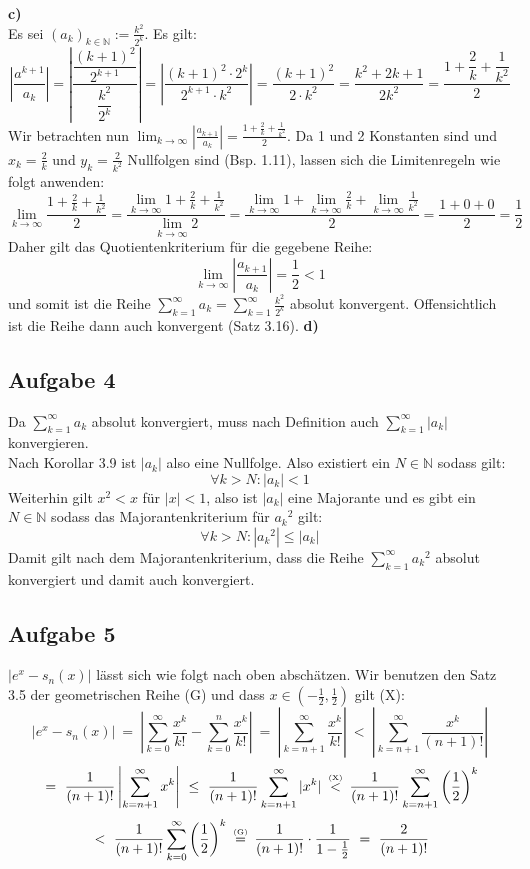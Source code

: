 \documentclass[a4paper,graphics,11pt]{article}
\newcommand{\aufgabe}[1]{\subsection*{Aufgabe #1}}
\newcommand{\up}[2]{\mathrel{\overset{\makebox[0pt]{\mbox{\normalfont\tiny #2}}}{#1}}}
\begin{document}
\textbf{c)}\\[5pt]
Es sei $\displaystyle(a_k)_{k \in \mathbb{N}} := \frac{k^2}{2^k}$. Es gilt:
$$
    \left|\frac{a^{k+1}}{a_k}\right|
    = \left|\frac{\dfrac{(k+1)^2}{2^{k+1}}}{{\dfrac{k^2}{2^k}}}\right|
    = \left|\frac{(k+1)^2 \cdot 2^k}{2^{k+1}\cdot k^2}\right|
    = \frac{(k+1)^2}{2\cdot k^2}
    = \frac{k^2+2k+1}{2k^2}
    = \frac{1+\dfrac{2}{k}+\dfrac{1}{k^2}}{2}
$$
Wir betrachten nun $\displaystyle\lim_{k \to \infty}\limits \left|\frac{a_{k+1}}{a_k}\right|
= \frac{1+\frac{2}{k}+\frac{1}{k^2}}{2}$. Da 1 und 2 Konstanten sind und
$x_k=\frac{2}{k}$ und $y_k=\frac{2}{k^2}$ Nullfolgen sind (Bsp. 1.11), lassen sich
die Limitenregeln wie folgt anwenden:
$$
    \lim_{k \to \infty} \frac{1+\frac{2}{k}+\frac{1}{k^2}}{2}
    = \frac{\lim_{k\to\infty}\limits1+\frac{2}{k}+\frac{1}{k^2}}{\lim_{k \to \infty}\limits 2}
    = \frac{\lim_{k \to \infty}\limits 1 + \lim_{k \to \infty}\limits \frac{2}{k}+ \lim_{k \to \infty}\limits \frac{1}{k^2}}{2}
    = \frac{1+0+0}{2} = \frac{1}{2}
$$
Daher gilt das Quotientenkriterium für die gegebene Reihe:
$$
    \lim_{k \to \infty} \left|\frac{a_{k+1}}{a_k}\right| = \frac{1}{2} < 1
$$
und somit ist die Reihe $\displaystyle\sum_{k=1}^{\infty} a_k = \sum_{k=1}^{\infty} \frac{k^2}{2^k}$
absolut konvergent. Offensichtlich ist die Reihe dann auch konvergent (Satz 3.16).
\newpage
\textbf{d)}\\[5pt]
\newpage
\aufgabe{4}
Da $\sum_{k=1}^{\infty} a_k$ absolut konvergiert, muss nach Definition auch
$\sum_{k=1}^{\infty} |a_k|$ konvergieren.\\
Nach Korollar 3.9 ist $|a_k|$ also eine Nullfolge.
Also existiert ein $N \in \mathbb{N}$ sodass gilt:
$$
    \forall k > N \colon |a_k| < 1
$$
Weiterhin gilt $x^2 < x$ für $|x| < 1$, also ist $|a_k|$ eine Majorante und es gibt ein
$N \in \mathbb{N}$ sodass das Majorantenkriterium für ${a_k}^2$ gilt:
$$
    \forall k > N \colon |{a_k}^2| \leq |a_k|
$$
Damit gilt nach dem Majorantenkriterium, dass die Reihe $\sum_{k=1}^{\infty} {a_k}^2$
absolut konvergiert und damit auch konvergiert.
\aufgabe{5}
$|e^x - s_n(x)|$ lässt sich wie folgt 
nach oben abschätzen. Wir benutzen den Satz 3.5 der geometrischen Reihe (G) und
dass $x\in \left(-\frac{1}{2},\frac{1}{2}\right)$ gilt (X):
$$
    |e^x-s_n(x)|
    \ =\ \left|\sum_{k=0}^{\infty} \frac{x^k}{k!} - \sum_{k=0}^{n} \frac{x^k}{k!}\right|
    \ =\ \left|\sum_{k=n+1}^{\infty} \frac{x^k}{k!}\right|
    \ <\ \left|\sum_{k=n+1}^{\infty} \frac{x^k}{(n+1)!}\right|
$$$$
    \ =\ \frac{1}{(n+1)!} \left|\sum_{k=n+1}^{\infty} x^k\right|
    \ \leq\ \frac{1}{(n+1)!} \sum_{k=n+1}^{\infty} |x^k|
    \up{\ <\ }{(X)}\frac{1}{(n+1)!} \sum_{k=n+1}^{\infty} \left(\frac{1}{2}\right)^k
$$$$
    \ <\ \frac{1}{(n+1)!} \sum_{k=0}^{\infty} \left(\frac{1}{2}\right)^k
    \up{\ =\ }{(G)}\frac{1}{(n+1)!}\cdot \frac{1}{1-\frac{1}{2}}
    \ =\ \frac{2}{(n+1)!}
$$
\end{document}
